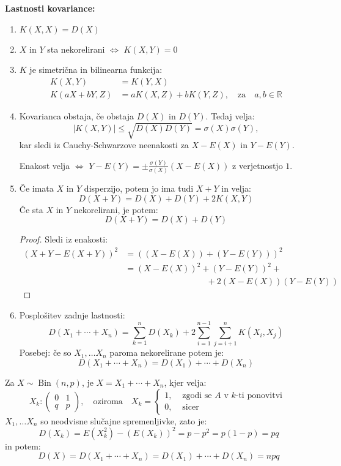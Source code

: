 \documentclass[12pt]{book}
\def\n{\noindent}
\theoremstyle{definition}
\theoremstyle{plain}
\theoremstyle{plain}
\theoremstyle{plain}
\theoremstyle{remark}
\begin{document}
\n \textbf{Lastnosti kovariance:}

\begin{enumerate}
    \item $K(X,X) = D(X)$
    \item $X$ in $Y$ sta nekorelirani $\iff$ $K(X,Y) = 0$
    \item $K$ je simetrična in bilinearna funkcija:
    $$
    \begin{aligned}
        K(X, Y)&=K(Y, X)  \\
        K(a X+b Y, Z)&=a K(X, Z)+b K(Y, Z), \quad \text{za} \quad a, b \in \mathbb{R}  
    \end{aligned}
    $$
    \item Kovarianca obstaja, če obstaja $D(X)$ in $D(Y)$. Tedaj velja:
    $$
    |K(X, Y)| \leq \sqrt{D(X) D(Y)}=\sigma(X) \sigma(Y),
    $$
    kar sledi iz Cauchy-Schwarzove neenakosti za $X-E(X)$ in $Y-E(Y)$. 
    
    Enakost velja $\iff$ $Y-E(Y)= \pm \frac{\sigma(Y)}{\sigma(X)} (X-E(X))$ z verjetnostjo $1$. 
    \item Če imata $X$ in $Y$ disperzijo, potem jo ima tudi $X+Y$ in velja: 
    $$
    D(X+Y)=D(X)+D(Y)+2 K(X, Y)
    $$
    Če sta $X$ in $Y$ nekorelirani, je potem: 
    $$
    D(X+Y)=D(X)+D(Y)
    $$ 
    \begin{proof}
        Sledi iz enakosti: 
        $$
        \begin{aligned}
            (X+Y-E(X+Y))^2&=\left((X-E(X))+(Y-E(Y))\right)^2 \\
            &= (X-E(X))^2+(Y-E(Y))^2 +\\
            &\hspace{4cm} +2(X-E(X)) (Y-E(Y))
        \end{aligned}
        $$
    \end{proof}
    \item Posplošitev zadnje lastnosti: 
    $$
    D\left(X_1+\cdots+X_n\right)=\sum_{k=1}^n D\left(X_k\right)+2 \sum_{i=1}^{n-1} \sum_{j=i+1}^n K\left(X_i, X_j\right)
    $$
    Posebej: če so $X_1, \ldots X_n$ paroma nekorelirane potem je: 
    $$
    D\left(X_1+\cdots+X_n\right)=D\left(X_1\right)+\cdots+D\left(X_n\right)
    $$
\end{enumerate}

\begin{zgled}
    Za $X \sim \operatorname{Bin}(n,p)$, je $X=X_1+\cdots+X_n$, kjer velja:
    $$
    X_k:\left(\begin{array}{cc} 0 & 1 \\ q & p \end{array}\right), \quad \text{oziroma} \quad X_k= \begin{cases}1, & \text { zgodi se $A$ v $k$-ti ponovitvi } \\ 0, & \text { sicer }\end{cases} 
    $$
    $X_1, \ldots X_n$ so neodvisne slučajne spremenljivke, zato je: 
    $$
    D\left(X_k\right)=E\left(X_k^2\right)-\left(E\left(X_k\right)\right)^2=p-p^2=p(1-p)=p q
    $$
    in potem: 
    $$
    D(X)=D\left(X_1+\cdots+X_n\right)=D\left(X_1\right)+\cdots+D\left(X_n\right)=n p q
    $$
\end{zgled}
\end{document}
